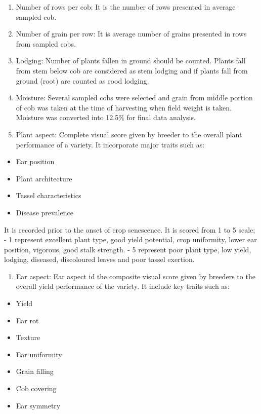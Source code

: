 \documentclass[
]{article}
\providecommand{\tightlist}{%
  \setlength{\itemsep}{0pt}\setlength{\parskip}{0pt}}
\begin{document}
\begin{enumerate}
\def\labelenumi{\arabic{enumi}.}
\setcounter{enumi}{9}
\item
  Number of rows per cob: It is the number of rows presented in average sampled cob.
\item
  Number of grain per row: It is average number of grains presented in rows from sampled cobs.
\item
  Lodging: Number of plants fallen in ground should be counted. Plants fall from stem below cob are considered as stem lodging and if plants fall from ground (root) are counted as rood lodging.
\item
  Moisture: Several sampled cobs were selected and grain from middle portion of cob was taken at the time of harvesting when field weight is taken. Moisture was converted into 12.5\% for final data analysis.
\item
  Plant aspect: Complete visual score given by breeder to the overall plant performance of a variety. It incorporate major traits such as:
\end{enumerate}

\begin{itemize}
\tightlist
\item
  Ear position
\item
  Plant architecture
\item
  Tassel characteristics
\item
  Disease prevalence
\end{itemize}

It is recorded prior to the onset of crop senescence. It is scored from 1 to 5 scale;
- 1 represent excellent plant type, good yield potential, crop uniformity, lower ear position, vigorous, good stalk strength.
- 5 represent poor plant type, low yield, lodging, diseased, discoloured leaves and poor tassel exertion.

\begin{enumerate}
\def\labelenumi{\arabic{enumi}.}
\setcounter{enumi}{14}
\tightlist
\item
  Ear aspect: Ear aspect id the composite visual score given by breeders to the overall yield performance of the variety. It include key traits such as:
\end{enumerate}

\begin{itemize}
\tightlist
\item
  Yield
\item
  Ear rot
\item
  Texture
\item
  Ear uniformity
\item
  Grain filling
\item
  Cob covering
\item
  Ear symmetry
\end{itemize}
\end{document}
